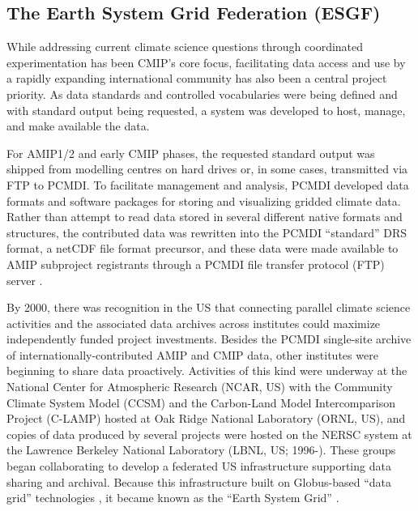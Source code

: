 \documentclass[manuscript]{copernicus}
\def\cred#1{{\color{red}#1}}
\begin{document}
\subsection{The Earth System Grid Federation (ESGF)}
\label{sec:earthSystemGridFederation}

While addressing current climate science questions through coordinated experimentation has been CMIP's core focus, facilitating data access and use by a rapidly expanding international community has also been a central project priority. As data standards and controlled vocabularies were being defined and with standard output being requested, a system was developed to host, manage, and make available the data.

For AMIP1/2 and early CMIP phases, the requested standard output was shipped from modelling centres on hard drives or, in some cases, transmitted via FTP to PCMDI. To facilitate management and analysis, PCMDI developed data formats and software packages for storing and visualizing gridded climate data. Rather than attempt to read data stored in several different native formats and structures, the contributed data was rewritten into the PCMDI ``standard'' DRS \citep[Data Retrieval and Storage;][]{drach_data_1995} format, a netCDF file format precursor, and these data were made available to AMIP subproject registrants through a PCMDI file transfer protocol (FTP) server \citep[see \autoref{tab:tab1-MIPsThroughTime};][]{gates_amip_1995}.

By 2000, there was recognition in the US that connecting parallel climate science activities and the associated data archives across institutes could maximize independently funded project investments. Besides the PCMDI single-site archive of internationally-contributed AMIP and CMIP data, other institutes were beginning to share data proactively. Activities of this kind were underway at the National Center for Atmospheric Research (NCAR, US) with the Community Climate System Model (CCSM) and the Carbon-Land Model Intercomparison Project (C-LAMP) hosted at Oak Ridge National Laboratory (ORNL, US), and copies of data produced by several projects were hosted on the NERSC system at the Lawrence Berkeley National Laboratory (LBNL, US; 1996-). These groups began collaborating to develop a federated US infrastructure supporting data sharing and archival. 
Because this infrastructure built on Globus-based ``data grid'' technologies \citep{foster_globus_1997,chervenak_data_2000}, it became known as the ``Earth System Grid'' \citep[ESG I;][]{bernholdt_earth_2007}. 
\end{document}
